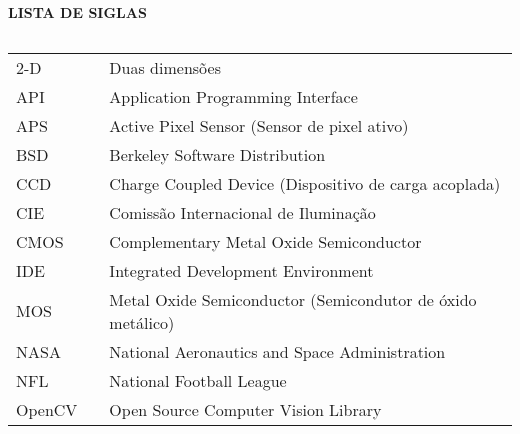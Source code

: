 \newpage

\begin{center}
\textbf{LISTA DE SIGLAS}
\end{center}
$\!$\\

\begin{tabular}{lll}
2-D & \hspace{1cm} & Duas dimensões \\

API & \hspace{1cm} & Application Programming Interface\\

APS & \hspace{1cm} & Active Pixel Sensor (Sensor de pixel ativo) \\

BSD & \hspace{1cm} & Berkeley Software Distribution \\

CCD & \hspace{1cm} & Charge Coupled Device (Dispositivo de carga acoplada) \\

CIE & \hspace{1cm} & Comissão Internacional de Iluminação \\

CMOS & \hspace{1cm} & Complementary Metal Oxide Semiconductor \\

IDE & \hspace{1cm} & Integrated Development Environment \\

MOS & \hspace{1cm} & Metal Oxide Semiconductor (Semicondutor de óxido metálico) \\

NASA & \hspace{1cm} & National Aeronautics and Space Administration \\

NFL & \hspace{1cm} & National Football League \\

OpenCV & \hspace{1cm} & Open Source Computer Vision Library \\


\end{tabular}
